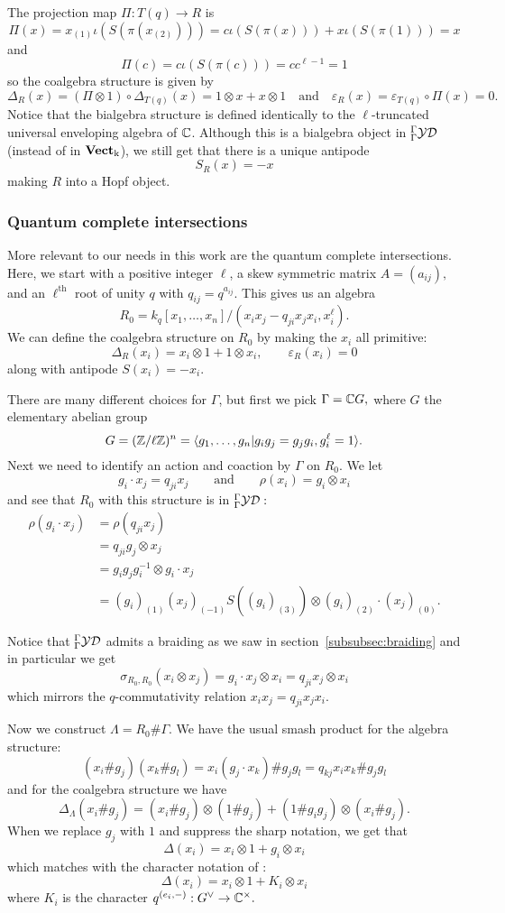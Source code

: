 \documentclass[12pt]{article}
\begin{document}
The projection map $\Pi:T(q)\to R$ is
\[\Pi(x)=x_{(1)}\iota(S(\pi(x_{(2)})))=c\iota(S(\pi(x)))+x\iota(S(\pi(1)))=x\]
and
\[\Pi(c)=c\iota(S(\pi(c)))=cc^{\ell-1}=1\]
so the coalgebra structure is given by
\[\Delta_R(x)=(\Pi\otimes 1)\circ\Delta_{T(q)}(x)=1\otimes x+x\otimes 1\quad\text{and}\quad\varepsilon_R(x)=\varepsilon_{T(q)}\circ\Pi(x)=0.\]
Notice that the bialgebra structure is defined identically to the $\ell$-truncated universal enveloping algebra of $\mathbb{C}$. Although this is a bialgebra object in ${^\Gamma_\Gamma\mathcal{YD}}$ (instead of in $\operatorname{\mathbf{Vect}_k}$), we still get that there is a unique antipode
\[S_R(x)=-x\]
making $R$ into a Hopf object.

\subsubsection{Quantum complete intersections}
More relevant to our needs in this work are the quantum complete intersections. Here, we start with a positive integer $\ell$, a skew symmetric matrix $A=(a_{ij}),$ and an $\ell^\text{th}$ root of unity $q$ with $q_{ij}=q^{a_{ij}}.$ This gives us an algebra
\[R_0=k_q[x_1,\dots,x_n]/(x_ix_j-q_{ji}x_jx_i, x_i^\ell).\]
We can define the coalgebra structure on $R_0$ by making the $x_i$ all primitive:
\[\Delta_R(x_i)=x_i\otimes 1+1\otimes x_i,\qquad \varepsilon_R(x_i)=0\]
along with antipode $S(x_i)=-x_i.$

There are many different choices for $\Gamma$, but first we pick $\Gamma=\mathbb{C} G,$ where $G$ the elementary abelian group
\[G=(\mathbb{Z}/\ell\mathbb{Z})^n=\langle g_1,\dots,g_n|g_ig_j=g_jg_i, g_i^\ell=1\rangle.\]
Next we need to identify an action and coaction by $\Gamma$ on $R_0$. We let
\[g_i\cdot x_j=q_{ji}x_j\qquad\text{and}\qquad \rho(x_i)=g_i\otimes x_i\]
and see that $R_0$ with this structure is in ${^\Gamma_\Gamma\mathcal{YD}}:$
\begin{align*}
    \rho(g_i\cdot x_j)&=\rho(q_{ji}x_j)\\
    &=q_{ji}g_j\otimes x_j\\
    &=g_ig_jg_i^{-1}\otimes g_i\cdot x_j\\
    &=(g_i)_{(1)}(x_j)_{(-1)}S((g_i)_{(3)})\otimes (g_i)_{(2)}\cdot (x_j)_{(0)}.
\end{align*}

Notice that ${^\Gamma_\Gamma\mathcal{YD}}$ admits a braiding as we saw in section~\ref{subsubsec:braiding} and in particular we get
\[\sigma_{R_0,R_0}(x_i\otimes x_j)=g_i\cdot x_j\otimes x_i=q_{ji}x_j\otimes x_i\]
which mirrors the $q$-commutativity relation $x_ix_j=q_{ji}x_jx_i.$

Now we construct $\Lambda=R_0\#\Gamma.$ We have the usual smash product for the algebra structure:
\[(x_i\#g_j)(x_k\#g_l)=x_i(g_j\cdot x_k)\#g_jg_l=q_{kj}x_ix_k\#g_jg_l\]
and for the coalgebra structure we have
\[\Delta_\Lambda(x_i\# g_j)=(x_i\# g_j)\otimes(1\# g_j) + (1\# g_ig_j)\otimes(x_i\# g_j).\]
When we replace $g_j$ with $1$ and suppress the sharp notation, we get that 
\[\Delta(x_i)=x_i\otimes 1+g_i\otimes x_i\]
which matches with the character notation of \cite{negron-pevtsovaI}:
\[\Delta(x_i)=x_i\otimes 1+K_i\otimes x_i\]
where $K_i$ is the character $q^{(e_i,-)}:G^\vee\to\mathbb{C}^\times.$
\end{document}
